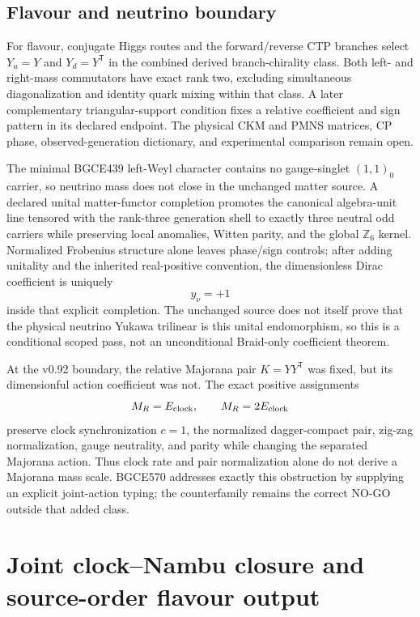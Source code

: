 \documentclass[11pt]{article}
\theoremstyle{definition}
\theoremstyle{remark}
\begin{document}
\subsection{Flavour and neutrino boundary}

For flavour, conjugate Higgs routes and the forward/reverse CTP branches select $Y_u=Y$ and $Y_d=Y^{\mathsf T}$ in the combined derived branch-chirality class. Both left- and right-mass commutators have exact rank two, excluding simultaneous diagonalization and identity quark mixing within that class. A later complementary triangular-support condition fixes a relative coefficient and sign pattern in its declared endpoint. The physical CKM and PMNS matrices, CP phase, observed-generation dictionary, and experimental comparison remain open.

The minimal BGCE439 left-Weyl character contains no gauge-singlet $(1,1)_0$ carrier, so neutrino mass does not close in the unchanged matter source. A declared unital matter-functor completion promotes the canonical algebra-unit line tensored with the rank-three generation shell to exactly three neutral odd carriers while preserving local anomalies, Witten parity, and the global $\mathbb Z_6$ kernel. Normalized Frobenius structure alone leaves phase/sign controls; after adding unitality and the inherited real-positive convention, the dimensionless Dirac coefficient is uniquely
\begin{equation}
 y_\nu=+1
\end{equation}
inside that explicit completion. The unchanged source does not itself prove that the physical neutrino Yukawa trilinear is this unital endomorphism, so this is a conditional scoped pass, not an unconditional Braid-only coefficient theorem.

At the v0.92 boundary, the relative Majorana pair $K=YY^{\mathsf T}$ was fixed, but its dimensionful action coefficient was not. The exact positive assignments
\begin{equation}
 M_R=E_{\rm clock},
 \qquad
 M_R=2E_{\rm clock}
\end{equation}
preserve clock synchronization $c=1$, the normalized dagger-compact pair, zig-zag normalization, gauge neutrality, and parity while changing the separated Majorana action. Thus clock rate and pair normalization alone do not derive a Majorana mass scale. BGCE570 addresses exactly this obstruction by supplying an explicit joint-action typing; the counterfamily remains the correct NO-GO outside that added class.

\section{Joint clock--Nambu closure and source-order flavour output}\label{sec:matter093}
\end{document}

